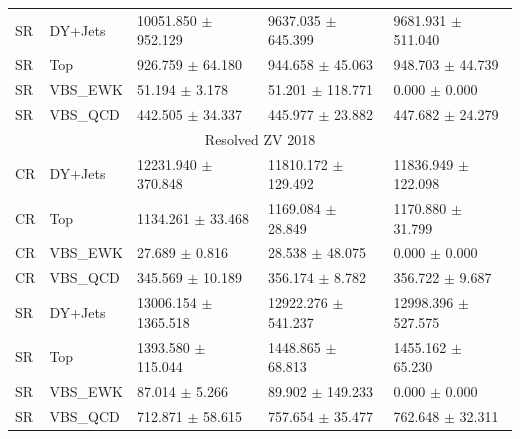 \begin{table}
{\begin{tabular}{lllll}
      SR     & DY+Jets  & 10051.850 \( \pm \) 952.129  & 9637.035 \( \pm \) 645.399  & 9681.931 \( \pm \) 511.040  \\
      SR     & Top      & 926.759 \( \pm \) 64.180     & 944.658 \( \pm \) 45.063    & 948.703 \( \pm \) 44.739    \\
      SR     & VBS\_EWK & 51.194 \( \pm \) 3.178       & 51.201 \( \pm \) 118.771    & 0.000 \( \pm \) 0.000       \\
      SR     & VBS\_QCD & 442.505 \( \pm \) 34.337     & 445.977 \( \pm \) 23.882    & 447.682 \( \pm \) 24.279    \\
      \midrule
      \multicolumn{5}{c}{Resolved ZV 2018}                                                                         \\
      \midrule
      CR     & DY+Jets  & 12231.940 \( \pm \) 370.848  & 11810.172 \( \pm \) 129.492 & 11836.949 \( \pm \) 122.098 \\
      CR     & Top      & 1134.261 \( \pm \) 33.468    & 1169.084 \( \pm \) 28.849   & 1170.880 \( \pm \) 31.799   \\
      CR     & VBS\_EWK & 27.689 \( \pm \) 0.816       & 28.538 \( \pm \) 48.075     & 0.000 \( \pm \) 0.000       \\
      CR     & VBS\_QCD & 345.569 \( \pm \) 10.189     & 356.174 \( \pm \) 8.782     & 356.722 \( \pm \) 9.687     \\
      SR     & DY+Jets  & 13006.154 \( \pm \) 1365.518 & 12922.276 \( \pm \) 541.237 & 12998.396 \( \pm \) 527.575 \\
      SR     & Top      & 1393.580 \( \pm \) 115.044   & 1448.865 \( \pm \) 68.813   & 1455.162 \( \pm \) 65.230   \\
      SR     & VBS\_EWK & 87.014 \( \pm \) 5.266       & 89.902 \( \pm \) 149.233    & 0.000 \( \pm \) 0.000       \\
      SR     & VBS\_QCD & 712.871 \( \pm \) 58.615     & 757.654 \( \pm \) 35.477    & 762.648 \( \pm \) 32.311    \\
      \bottomrule
    \end{tabular}}\label{tab:fit-values-zjj}
\end{table}
